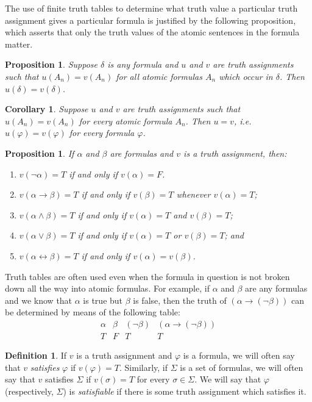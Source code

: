 \documentclass[12pt]{amsbook}
\newcommand{\fromto}{\leftrightarrow}
\theoremstyle{plain}
\newtheorem{prop}[thm]{Proposition}
\newtheorem{cor}[thm]{Corollary}
\theoremstyle{definition}
\newtheorem{defn}{Definition}[chapter]
\theoremstyle{remark}
\begin{document}
The use of finite truth tables to determine what truth value a particular truth assignment gives a particular formula is justified by the following proposition,  which asserts that only the truth values of the atomic sentences in the formula matter.

\begin{prop} \label{p:tav}
Suppose $\delta$ is any formula and $u$ and $v$ are truth assignments such that $u(A_n) = v(A_n)$ for all atomic formulas $A_n$ which occur in $\delta$.  Then $u(\delta) = v(\delta)$.
\end{prop}

\begin{cor} \label{c:tav}
Suppose $u$ and $v$ are truth assignments such that $u(A_n) = v(A_n)$ for every atomic formula $A_n$.  Then $u = v$,  {\em i.e.\/} $u(\varphi) = v(\varphi)$ for every formula $\varphi$.
\end{cor}

\begin{prop} \label{p:tif}
If $\alpha$ and $\beta$ are formulas and $v$ is a truth assignment,  then:
\begin{enumerate}
\item $v(\lnot \alpha) = T$ if and only if $v(\alpha) = F$.
\item $v(\alpha \to \beta) = T$ if and only if $v(\beta) = T$ whenever $v(\alpha) = T$;
\item $v(\alpha \land \beta) = T$ if and only if $v(\alpha) = T$ and $v(\beta) = T$;
\item $v(\alpha \lor \beta) = T$ if and only if $v(\alpha) = T$ or $v(\beta) = T$;  and
\item $v(\alpha \fromto \beta) = T$ if and only if $v(\alpha) = v(\beta)$.
\end{enumerate}
\end{prop}

Truth tables are often used even when the formula in question is not broken down all the way into atomic formulas.  For example,  if $\alpha$ and $\beta$ are any formulas and we know that $\alpha$ is true but $\beta$ is false,  then the truth of $(\alpha \to (\lnot \beta))$ can be determined by means of the following table:
\[
\begin{array}{c|c|c|c}
\alpha & \beta & (\lnot \beta) & (\alpha \to (\lnot \beta)) \\ \hline
T & F & T & T 
\end{array}
\]


\begin{defn} 
If $v$ is a truth assignment and $\varphi$ is a formula,  we will often say that $v$ {\em satisfies\/} $\varphi$ if $v(\varphi) = T$.  Similarly,  if $\Sigma$ is a set of formulas,  we will often say that $v$ satisfies $\Sigma$ if $v(\sigma) = T$ for every $\sigma \in \Sigma$.  We will say that $\varphi$ (respectively,  $\Sigma$) is {\em satisfiable\/} if there is some truth assignment which satisfies it.
\end{defn}
\end{document}
